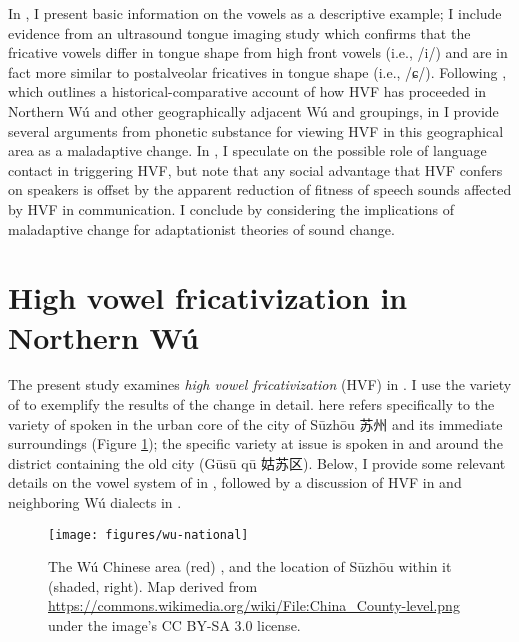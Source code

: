 \documentclass[output=paper,hidelinks]{langscibook}
\begin{document}
In , I present basic information on the \SC{} vowels as a descriptive example; I include evidence from an ultrasound tongue imaging study which confirms that the \SC{} fricative vowels differ in tongue shape from high front vowels (i.e., /i/) and are in fact more similar to postalveolar fricatives in tongue shape (i.e., /ɕ/).
%
Following , which outlines a historical-comparative account of how HVF has proceeded in Northern Wú and other geographically adjacent Wú and  groupings, in  I provide several arguments from phonetic substance for viewing HVF in this geographical area as a maladaptive change.
%
In , I speculate on the possible role of language contact in triggering HVF, but note that any social advantage that HVF confers on speakers is offset by the apparent reduction of fitness of speech sounds affected by HVF in communication.
%
I conclude by considering the implications of maladaptive change for adaptationist theories of sound change.


\section{High vowel fricativization in Northern Wú}\label{sec:faytak:2}

The present study examines \textit{high vowel fricativization} (HVF) in .
%
I use the variety of \SC{} to exemplify the results of the change in detail. \SC{} here refers specifically to the variety of  spoken in the urban core of the city of S\={u}zh\={o}u {\cjkfont 苏州} and its immediate surroundings (Figure \ref{fig:wu-map}); the specific variety at issue is spoken in and around the district containing the old city (G\=us\=u q\=u {\cjkfont 姑苏区}). Below, I provide some relevant details on the vowel system of \SC{} in , followed by a discussion of HVF in \SC{} and neighboring Wú dialects in .
%

\begin{figure}[t]
\caption{The Wú Chinese area (red) \citep{yan-min, yan-population, zhao-anhui}, and the location of Sūzhōu within it (shaded, right). Map derived from \protect\url{https://commons.wikimedia.org/wiki/File:China_County-level.png} under the image's CC BY-SA 3.0 license.}
\label{fig:wu-map}
	\texttt{[image: figures/wu-national]}
\end{figure}
\end{document}
